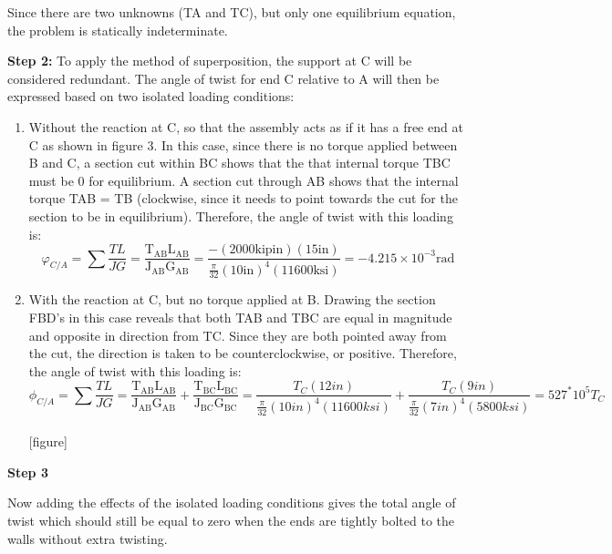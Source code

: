 \documentclass[
  letterpaper,
  DIV=11,
  numbers=noendperiod]{scrreprt}
\begin{document}
\begin{tcolorbox}
\begin{tcolorbox}
Since there are two unknowns (TA and TC), but only one equilibrium
equation, the problem is statically indeterminate.

\textbf{Step 2:} To apply the method of superposition, the support at C
will be considered redundant. The angle of twist for end C relative to A
will then be expressed based on two isolated loading conditions:

\begin{enumerate}
\def\labelenumi{\arabic{enumi}.}
\item
  Without the reaction at C, so that the assembly acts as if it has a
  free end at C as shown in figure 3. In this case, since there is no
  torque applied between B and C, a section cut within BC shows that the
  that internal torque TBC must be 0 for equilibrium. A section cut
  through AB shows that the internal torque TAB = TB (clockwise, since
  it needs to point towards the cut for the section to be in
  equilibrium). Therefore, the angle of twist with this loading is:\\
  \[
  \varphi_{C / A}=\sum \frac{T L}{J G}=\frac{\mathrm{T}_{\mathrm{AB}} \mathrm{L}_{\mathrm{AB}}}{\mathrm{J}_{\mathrm{AB}} \mathrm{G}_{\mathrm{AB}}}=\frac{-(2000 \mathrm{kip} \mathrm{in})(15 \mathrm{in})}{\frac{\pi}{32}(10 \mathrm{in})^4(11600 \mathrm{ksi})}=-4.215 \times 10^{-3} \mathrm{rad}
  \]
\item
  With the reaction at C, but no torque applied at B. Drawing the
  section FBD's in this case reveals that both TAB and TBC are equal in
  magnitude and opposite in direction from TC. Since they are both
  pointed away from the cut, the direction is taken to be
  counterclockwise, or positive. Therefore, the angle of twist with this
  loading is:\\
  \[
  \phi_{C / A}=\sum \frac{T L}{J G}=\frac{\mathrm{T}_{\mathrm{AB}} \mathrm{L}_{\mathrm{AB}}}{\mathrm{J}_{\mathrm{AB}} \mathrm{G}_{\mathrm{AB}}}+\frac{\mathrm{T}_{\mathrm{BC}} \mathrm{L}_{\mathrm{BC}}}{\mathrm{J}_{\mathrm{BC}} \mathrm{G}_{\mathrm{BC}}}=\frac{T_C(12 i n)}{\frac{\pi}{32}(10 i n)^4(11600 k s i)}+\frac{T_C(9 i n)}{\frac{\pi}{32}(7 i n)^4(5800 k s i)}=527^* 10^5 T_{C}
  \]\\
  {[}figure{]}
\end{enumerate}

\textbf{Step 3}

Now adding the effects of the isolated loading conditions gives the
total angle of twist which should still be equal to zero when the ends
are tightly bolted to the walls without extra twisting.


\end{tcolorbox}
\end{tcolorbox}
\end{document}
